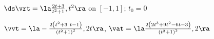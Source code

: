 {$\ds \vrt = \la \frac{2t+3}{t^2+1},t^2\ra$ on $[-1,1]$; $t_0= 0$
}
{
$\vvt = \la -\frac{2 \left(t^2+3 \
t-1\right)}{\left(t^2+1\right)^2},2 t\ra$, $\vat = \la \frac{2 \left(2 t^3+9 t^2-6 t-3\right)}{\left(t^2+1\right)^3},2\ra$

}

